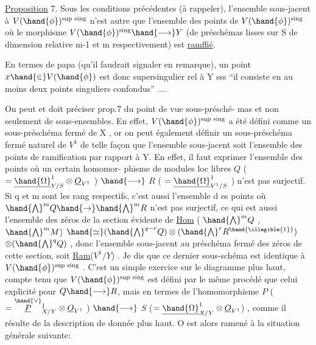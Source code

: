 
\uline{Proposition} 7. Sous les conditions précédentes (à rappeler), l'ensemble
sous-jacent à $V(\hand{\phi})^{\text{sup sing}}$ n'est autre que l'ensemble des points de
$V(\hand{\phi})^{\text{sing}}$  où le morphisme $V(\hand{\phi})^{\text{sing}}\hand{\longrightarrow} Y$ (de préschémas lisses
sur S de dimension relative m-1 et m respectivement) est \uline{ramffié}.

En termes de papa (qu'il faudrait signaler en remarque), un point
$x \hand{\in} V(\hand{\phi})$ est donc supersingulier rel à Y sss ``il consiste en au
moins deux points singuliers confondus'' ....

On peut et doit préciser prop.7 du point de vue   sous-présché-%
mas et non seulement de sous-ensembles. En effet, $V(\hand{\phi})^{\text{sup sing}}$ a été
défini comme un sous-préschéma fermé de X , or on peut également définir
un sous-préschéma fermé naturel de $V^1$ de telle façon que l'ensemble
sous-jacent soit l'ensemble des points de ramification par rapport à Y.
En effet, il faut exprimer l'ensemble des points où un certain homomor-%
phisme de modules loc libres $Q$ ( $=\underline{\hand{\Omega}}^1_{Y/S}\otimes\underline{O}_{V^1}$ ) $\hand{\longrightarrow}$ $R$ ( $=\underline{\hand{\Omega}}^1_{V^1/S}$ )
n'est pas surjectif. Si q et m sont les rang respectifs, c'est aussi
l'ensemble d es points où $\hand{\bigwedge}^{m} Q \hand{\rightarrow} \hand{\bigwedge}^{m} R$ n'est pas surjectif, ce qui est
aussi l'ensemble des zéros de la section évidente de \uline{Hom} ( $\hand{\bigwedge}^{m} Q$ , $\hand{\bigwedge}^{m} M$)
$\hand{\simeq} (\hand{\bigwedge}^{q-r} Q)\otimes(\hand{\bigwedge}^{r} R^{\hand{\illegible{1}}})$$\otimes(\hand{\bigwedge}^{q} Q)$\hand{$^{\vee}$} , donc l'ensemble sous-jacent au préschéma
fermé des zéros de cette section, soit \uline{Ram}($V^1/Y$) . Je dis que ce dernier
sous-schéma est identique à $V(\hand{\phi})^{\text{sup sing}}$ . C'est un simple exercice
sur le diagramme plus haut, compte tenu que $V(\hand{\phi})^{\text{sup sing}}$ est défini
par le même procédé que celui explicité pour $Q\hand{\longrightarrow} R$, mais en termes de
l'homomorphisme $P$ ( $= \overset{\hand{\vee}}{\underline{P}}{}^1_{X/Y}\otimes\underline{O}_{V^1}$ ) $\hand{\longrightarrow}$ $S$ ($=\underline{\hand{\Omega}}^1_{X/Y}\otimes\underline{O}_{V^1}$) , comme
il résulte de la description de \hand{$\mu$} donnée plus haut. O est alors
ramené à la situation générale suivante:

